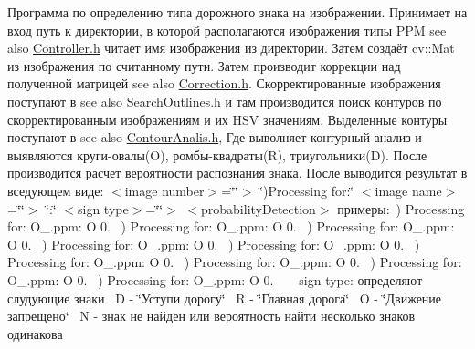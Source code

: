 Программа по определению типа дорожного знака на изображении. Принимает на вход путь к директории, в которой располагаются изображения типы P\+P\+M see also \hyperlink{_controller_8h}{Controller.\+h} читает имя изображения из директории. Затем создаёт cv\+::\+Mat из изображения по считанному пути. Затем производит коррекции над полученной матрицей see also \hyperlink{_correction_8h}{Correction.\+h}. Скорректированные изображения поступают в see also \hyperlink{_search_outlines_8h}{Search\+Outlines.\+h} и там производится поиск контуров по скорректированным изображениям и их H\+S\+V значениям. Выделенные контуры поступают в see also \hyperlink{_contour_analis_8h}{Contour\+Analis.\+h}, Где выволняет контурный анализ и выявляются круги-\/овалы(O), ромбы-\/квадраты(R), триугольники(\+D). После производится расчет вероятности распознания знака. После выводится результат в вседующем виде\+: $<$image number$>$=\char`\"{}\char`\"{}$>$ \char`\"{})\+Processing for\+:\char`\"{} $<$image name$>$=\char`\"{}\char`\"{}$>$ \char`\"{}\+:\char`\"{} $<$sign type$>$=\char`\"{}\char`\"{}$>$ $<$probability\+Detection$>$ примеры\+:~) Processing for\+: O\+\_.\+ppm\+: O 0. ~) Processing for\+: O\+\_.\+ppm\+: O 0. ~) Processing for\+: O\+\_.\+ppm\+: O 0. ~) Processing for\+: O\+\_.\+ppm\+: O 0. ~) Processing for\+: O\+\_.\+ppm\+: O 0. ~) Processing for\+: O\+\_.\+ppm\+: O 0. ~) Processing for\+: O\+\_.\+ppm\+: O 0. ~) Processing for\+: O\+\_.\+ppm\+: O 0. ~) Processing for\+: O\+\_.\+ppm\+: O 0. ~\newline
 ~\newline
 sign type\+: определяют слудующие знаки~\newline
 D -\/ \char`\"{}Уступи дорогу\char`\"{}~\newline
 R -\/ \char`\"{}Главная дорога\char`\"{}~\newline
 O -\/ \char`\"{}Движение запрещено\char`\"{}~\newline
 N -\/ знак не найден или вероятность найти несколько знаков одинакова ~\newline
